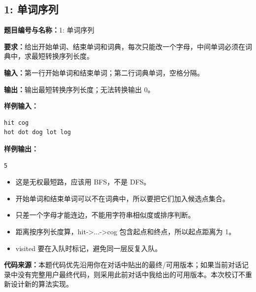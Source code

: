 \documentclass[10pt,a4paper,fontset=none]{ctexart}
\newcommand{\codesource}{\par\noindent\textbf{代码来源：}本题代码优先沿用你在对话中贴出的最终/可用版本；如果当前对话记录中没有完整用户最终代码，则采用此前对话中我给出的可用版本。本次校订不重新设计新的算法实现。\par\vspace{0.2em}}
\begin{document}
\subsection{1: 单词序列}
\begin{taskbox}
\textbf{题目编号与名称：}1: 单词序列\par
\textbf{要求：}给出开始单词、结束单词和词典，每次只能改一个字母，中间单词必须在词典中，求最短转换序列长度。\par
\textbf{输入：}第一行开始单词和结束单词；第二行词典单词，空格分隔。\par
\textbf{输出：}输出最短转换序列长度；无法转换输出 0。\par
\textbf{样例输入：}
\begin{lstlisting}[style=sample]
hit cog
hot dot dog lot log
\end{lstlisting}
\textbf{样例输出：}
\begin{lstlisting}[style=sample]
5
\end{lstlisting}
\end{taskbox}
\begin{mistakebox}
\begin{itemize}
  \item 这是无权最短路，应该用 BFS，不是 DFS。
  \item 开始单词和结束单词可以不在词典中，所以要把它们加入候选点集合。
  \item 只差一个字母才能连边，不能用字符串相似度或排序判断。
  \item 距离按序列长度算，hit->...->cog 包含起点和终点，所以起点距离为 1。
  \item visited 要在入队时标记，避免同一层反复入队。
\end{itemize}
\end{mistakebox}
\codesource
\end{document}
